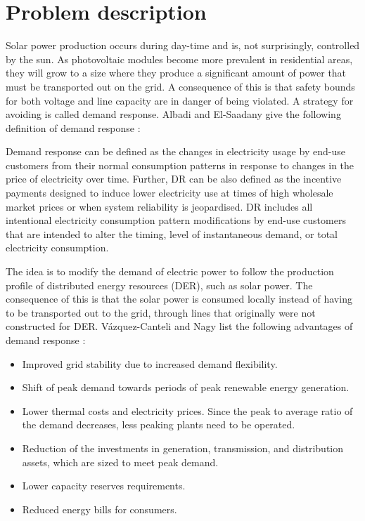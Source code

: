 \documentclass[class=book, crop=false]{standalone}
\begin{document}
\section{Problem description}\label{section:problem_description}
Solar power production occurs during day-time and is, not surprisingly, controlled by the sun. As photovoltaic modules become more prevalent in residential areas, they will grow to a size where they produce a significant amount of power that must be transported out on the grid. A consequence of this is that safety bounds for both voltage and line capacity are in danger of being violated. A strategy for avoiding is called demand response. Albadi and El-Saadany give the following definition of demand response \cite{demand_response_definition}:

\begin{displayquote}
Demand response can be defined as the changes in electricity usage by end-use customers from their normal consumption patterns in response to changes in the price of electricity over time. Further, DR can be also defined as the incentive payments designed to induce lower electricity use at times of high wholesale market prices or when system reliability is jeopardised. DR includes all intentional electricity consumption pattern modifications by end-use customers that are intended to alter the timing, level of
instantaneous demand, or total electricity consumption.
\end{displayquote}


The idea is to modify the demand of electric power to follow the production profile of distributed energy resources (DER), such as solar power. The consequence of this is that the solar power is consumed locally instead of having to be transported out to the grid, through lines that originally were not constructed for DER. Vázquez-Canteli and Nagy list the following advantages of demand response \cite{active_network_management}:

\begin{itemize}
\item Improved grid stability due to increased demand flexibility. 
\item Shift of peak demand towards periods of peak renewable energy
generation.
\item Lower thermal costs and electricity prices. Since the peak to average
ratio of the demand decreases, less peaking plants need to be operated. 
\item Reduction of the investments in generation, transmission, and distribution assets, which are sized to meet peak demand.
\item Lower capacity reserves requirements.
\item Reduced energy bills for consumers. 
\end{itemize}
\end{document}
